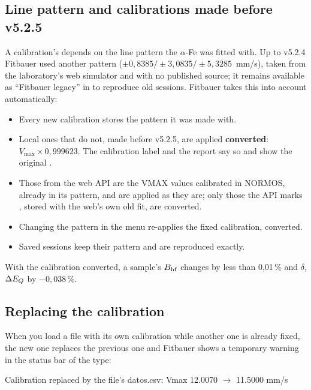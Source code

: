 
\subsection{Line pattern and calibrations made before v5.2.5}
\label{sec:calib-patron}

A calibration's  depends on the line pattern the $\alpha$-Fe was fitted
with. Up to v5.2.4 Fitbauer used another pattern ($\pm0{,}8385 / \pm3{,}0835 /
\pm5{,}3285$~mm/s), taken from the laboratory's web simulator and with no published
source; it remains available as ``Fitbauer legacy'' in  to reproduce old sessions. Fitbauer takes this into account
automatically:
\begin{itemize}[nosep]
  \item Every new calibration stores the pattern it was made with.
  \item Local ones that do not, made before v5.2.5, are applied
        \textbf{converted}: $V_\text{max} \times 0{,}999623$. The calibration label
        and the report say so and show the original .
  \item Those from the web API are the VMAX values calibrated in NORMOS, already in
        its pattern, and are applied as they are; only those the API marks
        , stored with the web's own old fit, are converted.
  \item Changing the pattern in the menu re-applies the fixed calibration,
        converted.
  \item Saved sessions keep their pattern and are reproduced exactly.
\end{itemize}
With the calibration converted, a sample's $B_{\mathrm{hf}}$ changes by less than 0{,}01\,\%
and $\delta$, $\Delta E_{Q}$ by $-0{,}038\,\%$.


\subsection{Replacing the calibration}

When you load a file with its own calibration while another one is already fixed,
the new one replaces the previous one and Fitbauer shows a temporary warning in
the status bar of the type:

\begin{center}\ttfamily\small
Calibration replaced by the file's datos.csv: Vmax 12.0070 $\to$ 11.5000 mm/s
\end{center}

